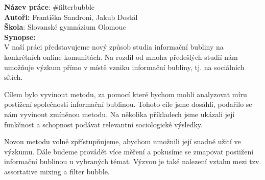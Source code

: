 \documentclass[12pt, a4paper]{article}
\begin{document}
\noindent \textbf{Název práce}: \#filterbubble\\
\textbf{Autoři:} Františka Sandroni, Jakub Dost\'al\\
\textbf{Škola}: Slovanské gymnázium Olomouc\\
\textbf{Synopse:}\\
V naší práci představujeme nový způsob studia informační bubliny na kon\-krét\-ních online komunitách. Na rozdíl od mnoha předešlých studií nám u\-mož\-ňu\-je výzkum přímo v místě vzniku informační bubliny, tj. na sociálních sítích.

Cílem bylo vyvinout metodu, za pomocí které bychom mohli analyzovat míru postižení společnosti informační bublinou. Tohoto cíle jsme dosáhli, podařilo se nám vyvinout zmíněnou metodu. Na několika příkladech jsme ukázali její funkčnost a schopnost podávat relevantní sociologické výsledky.

Novou metodu volně zpřístupňujeme, abychom umožnili její snadné užití ve výzkumu. Dále budeme provádět více měření a pokusíme se zmapovat postižení informační bublinou u vybraných témat. Výzvou je také nalezení vztahu mezi tzv. assortative mixing a filter bubble.
\end{document}
